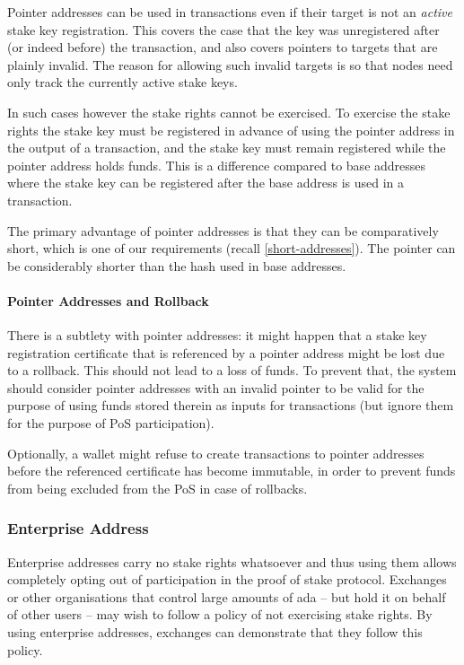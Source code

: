 \documentclass[11pt,a4paper,dvipsnames,twosided]{article}
\begin{document}
Pointer addresses can be used in transactions even if their target is
not an \emph{active} stake key registration. This covers the case that
the key was unregistered after (or indeed before) the transaction, and
also covers pointers to targets that are plainly invalid. The reason for
allowing such invalid targets is so that nodes need only track the
currently active stake keys.

In such cases however the stake rights cannot be exercised. To exercise
the stake rights the stake key must be registered in advance of using
the pointer address in the output of a transaction, and the stake key
must remain registered while the pointer address holds funds. This is a
difference compared to base addresses where the stake key can be
registered after the base address is used in a transaction.

The primary advantage of pointer addresses is that they can be
comparatively short, which is one of our requirements (recall
\cref{short-addresses}). The pointer can be considerably shorter than
the hash used in base addresses.

\paragraph{Pointer Addresses and Rollback}
There is a subtlety with pointer addresses: it might happen that a
stake key registration certificate that is referenced by a pointer
address might be lost due to a rollback. This should not lead to
a loss of funds. To prevent that, the system should
consider pointer addresses with an invalid pointer to be valid for the
purpose of using funds stored therein as inputs for transactions (but
ignore them for the purpose of PoS participation).

Optionally, a wallet might refuse to create transactions to pointer
addresses before the referenced certificate has become immutable, in
order to prevent funds from being excluded from the PoS in case of
rollbacks.

\subsubsection{Enterprise Address}
\label{enterprise-address}

Enterprise addresses carry no stake rights whatsoever and thus using
them allows completely opting out of participation in the proof of stake
protocol. Exchanges or other organisations that control large amounts of
ada -- but hold it on behalf of other users -- may wish to follow a
policy of not exercising stake rights. By using enterprise addresses,
exchanges can demonstrate that they follow this policy.
\end{document}
